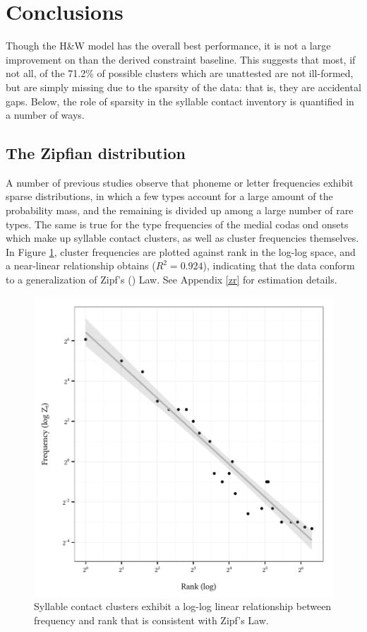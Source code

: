 \section{Conclusions}

Though the H\&W model has the overall best performance, it is not a large improvement on than the derived constraint baseline. This suggests that most, if not all, of the 71.2\% of possible clusters which are unattested are not ill-formed, but are simply missing due to the sparsity of the data: that is, they are accidental gaps. Below, the role of sparsity in the syllable contact inventory is quantified in a number of ways.

\subsection{The Zipfian distribution}

A number of previous studies \citep[e.g.,][]{Weiss1961,Sigurd1968,Good1969,Borodovsky1989,Witten1990,Martindale1996,Tambovtsev2007} observe that phoneme or letter frequencies exhibit sparse distributions, in which a few types account for a large amount of the probability mass, and the remaining is divided up among a large number of rare types. The same is true for the type frequencies of the medial codas ond onsets which make up syllable contact clusters, as well as cluster frequencies themselves. In Figure \ref{clus}, cluster frequencies are plotted against rank in the log-log space, and a near-linear relationship obtains ($R^2 = 0.924$), indicating that the data conform to a generalization of Zipf's (\citeyear{Zipf1949}) Law. See Appendix \ref{zr} for estimation details.

\begin{figure} \centering
\includegraphics{cluster.pdf}
\caption{Syllable contact clusters exhibit a log-log linear relationship between frequency and rank that is consistent with Zipf's Law.}
\label{clus}
\end{figure}

